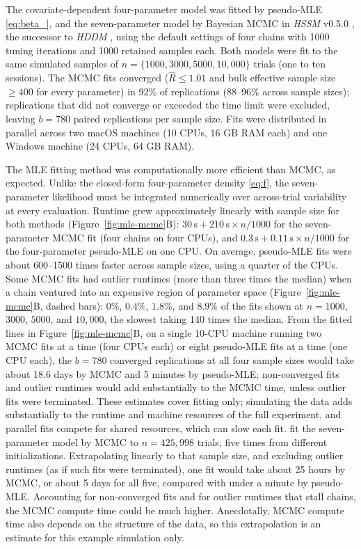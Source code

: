 \documentclass[00-main.tex]{subfiles}
\begin{document}
The covariate-dependent four-parameter model was fitted by pseudo-MLE \eqref{eq:beta_}, and the seven-parameter model by Bayesian MCMC in \emph{HSSM} v0.5.0 \citep{fengler_hssm_2026}, the successor to \emph{HDDM} \citep{wiecki_hddm_2013}, using the default settings of four chains with 1000 tuning iterations and 1000 retained samples each. Both models were fit to the same simulated samples of $n=\{1000, 3000, 5000, 10{,}000\}$ trials (one to ten sessions). The MCMC fits converged ($\hat{R} \le 1.01$ and bulk effective sample size $\ge 400$ for every parameter) in $92\%$ of replications ($88$--$96\%$ across sample sizes); replications that did not converge or exceeded the time limit were excluded, leaving $b=780$ paired replications per sample size. Fits were distributed in parallel across two macOS machines (10 CPUs, 16 GB RAM each) and one Windows machine (24 CPUs, 64 GB RAM).

The MLE fitting method was computationally more efficient than MCMC, as expected. Unlike the closed-form four-parameter density \eqref{eq:f}, the seven-parameter likelihood must be integrated numerically over across-trial variability at every evaluation. Runtime grew approximately linearly with sample size for both methods (Figure~\ref{fig:mle-mcmc}B): $30\,\text{s} + 210\,\text{s} \times n/1000$ for the seven-parameter MCMC fit (four chains on four CPUs), and $0.3\,\text{s} + 0.11\,\text{s} \times n/1000$ for the four-parameter pseudo-MLE on one CPU. On average, pseudo-MLE fits were about 600--1500 times faster across sample sizes, using a quarter of the CPUs. Some MCMC fits had outlier runtimes (more than three times the median) when a chain ventured into an expensive region of parameter space (Figure~\ref{fig:mle-mcmc}B, dashed bars): $0\%$, $0.4\%$, $1.8\%$, and $8.9\%$ of the fits shown at $n=1000$, $3000$, $5000$, and $10{,}000$, the slowest taking 140 times the median. From the fitted lines in Figure~\ref{fig:mle-mcmc}B, on a single 10-CPU machine running two MCMC fits at a time (four CPUs each) or eight pseudo-MLE fits at a time (one CPU each), the $b=780$ converged replications at all four sample sizes would take about 18.6 days by MCMC and 5 minutes by pseudo-MLE; non-converged fits and outlier runtimes would add substantially to the MCMC time, unless outlier fits were terminated. These estimates cover fitting only; simulating the data adds substantially to the runtime and machine resources of the full experiment, and parallel fits compete for shared resources, which can slow each fit. \citet{nguyen_different_2022} fit the seven-parameter model by MCMC to $n=425{,}998$ trials, five times from different initializations. Extrapolating linearly to that sample size, and excluding outlier runtimes (as if such fits were terminated), one fit would take about 25 hours by MCMC, or about 5 days for all five, compared with under a minute by pseudo-MLE. Accounting for non-converged fits and for outlier runtimes that stall chains, the MCMC compute time could be much higher. Anecdotally, MCMC compute time also depends on the structure of the data, so this extrapolation is an estimate for this example simulation only.
\end{document}
